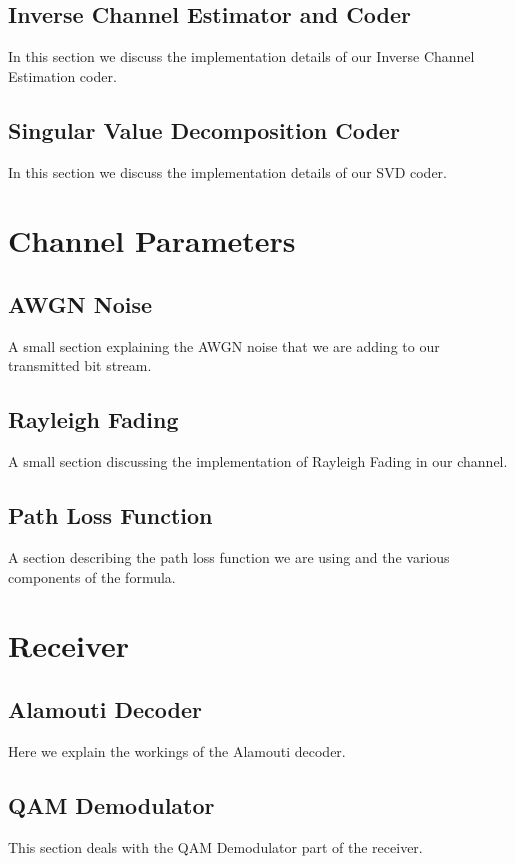 \subsection{Inverse Channel Estimator and Coder}
In this section we discuss the implementation details of our Inverse Channel Estimation coder.


\subsection{Singular Value Decomposition Coder}
In this section we discuss the implementation details of our SVD coder. 

\section{Channel Parameters}

\subsection{AWGN Noise}
A small section explaining the AWGN noise that we are adding to our transmitted bit stream.

\subsection{Rayleigh Fading}
A small section discussing the implementation of Rayleigh Fading in our channel.

\subsection{Path Loss Function}
A section describing the path loss function we are using and the various components of the formula.


\section{Receiver}

\subsection{Alamouti Decoder}
Here we explain the workings of the Alamouti decoder.

\subsection{QAM Demodulator}
This section deals with the QAM Demodulator part of the receiver.


